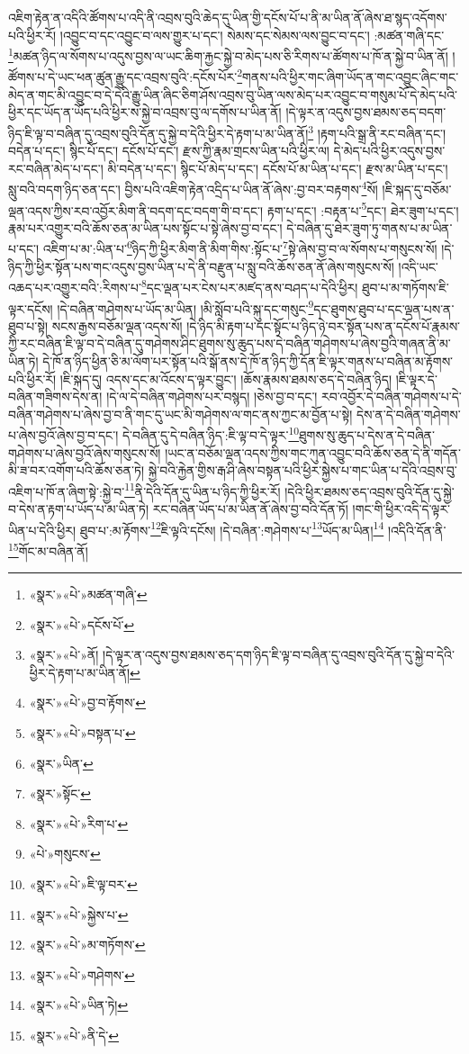 འཇིག་རྟེན་ན་འདིའི་ཚོགས་པ་འདི་ནི་འབྲས་བུའི་ཆེད་དུ་ཡིན་གྱི་དངོས་པོ་པ་ནི་མ་ཡིན་ནོ་ཞེས་ཐ་སྙད་འདོགས་པའི་ཕྱིར་རོ། །འབྱུང་བ་དང་འབྱུང་བ་ལས་གྱུར་པ་དང་། སེམས་དང་སེམས་ལས་བྱུང་བ་དང་། :མཚན་གཞི་དང་\footnote{«སྣར་»«པེ་»མཚན་གཞི་}མཚན་ཉིད་ལ་སོགས་པ་འདུས་བྱས་ལ་ཡང་ཆིག་རྐྱང་སྐྱེ་བ་མེད་པས་ཅི་རིགས་པ་ཚོགས་པ་ཁོ་ན་སྐྱེ་བ་ཡིན་ནོ། །ཚོགས་པ་དེ་ཡང་ཕན་ཚུན་རྒྱུ་དང་འབྲས་བུའི་:དངོས་པོར་\footnote{«སྣར་»«པེ་»དངོས་པོ་}གནས་པའི་ཕྱིར་གང་ཞིག་ཡོད་ན་གང་འབྱུང་ཞིང་གང་མེད་ན་གང་མི་འབྱུང་བ་དེ་དེའི་རྒྱུ་ཡིན་ཞིང་ཅིག་ཤོས་འབྲས་བུ་ཡིན་ལས་མེད་པར་འབྱུང་བ་གསུམ་པོ་དེ་མེད་པའི་ཕྱིར་དང་ཡོད་ན་ཡོད་པའི་ཕྱིར་ས་སྐྱེ་བ་འབྲས་བུ་ལ་དགོས་པ་ཡིན་ནོ། །དེ་ལྟར་ན་འདུས་བྱས་ཐམས་ཅད་བདག་ཉིད་ཇི་ལྟ་བ་བཞིན་དུ་འབྲས་བུའི་དོན་དུ་སྐྱེ་བ་དེའི་ཕྱིར་དེ་རྟག་པ་མ་ཡིན་ནོ།\footnote{«སྣར་»«པེ་»ནོ། །དེ་ལྟར་ན་འདུས་བྱས་ཐམས་ཅད་དག་ཉིད་ཇི་ལྟ་བ་བཞིན་དུ་འབྲས་བུའི་དོན་དུ་སྐྱེ་བ་དེའི་ཕྱིར་དེ་རྟག་པ་མ་ཡིན་ནོ།} །རྟག་པའི་སྒྲ་ནི་རང་བཞིན་དང་། བདེན་པ་དང་། སྙིང་པོ་དང་། དངོས་པོ་དང་། རྫས་ཀྱི་རྣམ་གྲངས་ཡིན་པའི་ཕྱིར་ལ། དེ་མེད་པའི་ཕྱིར་འདུས་བྱས་རང་བཞིན་མེད་པ་དང་། མི་བདེན་པ་དང་། སྙིང་པོ་མེད་པ་དང་། དངོས་པོ་མ་ཡིན་པ་དང་། རྫས་མ་ཡིན་པ་དང་། སླུ་བའི་བདག་ཉིད་ཅན་དང་། བྱིས་པའི་འཇིག་རྟེན་འདྲིད་པ་ཡིན་ནོ་ཞེས་:བྱ་བར་བརྟགས་\footnote{«སྣར་»«པེ་»བྱ་བ་རྟོགས་}སོ། །ཇི་སྐད་དུ་བཅོམ་ལྡན་འདས་ཀྱིས་རབ་འབྱོར་མིག་ནི་བདག་དང་བདག་གི་བ་དང་། རྟག་པ་དང་། :བརྟན་པ་\footnote{«སྣར་»«པེ་»བསྟན་པ་}དང་། ཐེར་ཟུག་པ་དང་། རྣམ་པར་འགྱུར་བའི་ཆོས་ཅན་མ་ཡིན་པས་སྟོང་པ་སྟེ་ཞེས་བྱ་བ་དང་། དེ་བཞིན་དུ་ཐེར་ཟུག་ཏུ་གནས་པ་མ་ཡིན་པ་དང་། འཇིག་པ་མ་:ཡིན་པ་\footnote{«སྣར་»ཡིན་}ཉིད་ཀྱི་ཕྱིར་མིག་ནི་མིག་གིས་:སྟོང་པ་\footnote{«སྣར་»སྟོང་}སྟེ་ཞེས་བྱ་བ་ལ་སོགས་པ་གསུངས་སོ། །དེ་ཉིད་ཀྱི་ཕྱིར་སྟོན་པས་གང་འདུས་བྱས་ཡིན་པ་དེ་ནི་བརྫུན་པ་སླུ་བའི་ཆོས་ཅན་ནོ་ཞེས་གསུངས་སོ། །འདི་ཡང་འཆད་པར་འགྱུར་བའི་:རིགས་པ་\footnote{«སྣར་»«པེ་»རིག་པ་}དང་ལྡན་པར་ངེས་པར་མཛད་ནས་བཤད་པ་དེའི་ཕྱིར། ཐུབ་པ་མ་གཏོགས་ཇི་ལྟར་དངོས། །དེ་བཞིན་གཤེགས་པ་ཡོད་མ་ཡིན། །མི་སློབ་པའི་སྐུ་དང་གསུང་\footnote{«པེ་»གསུངས་}དང་ཐུགས་ཐུབ་པ་དང་ལྡན་པས་ན་ཐུབ་པ་སྟེ། སངས་རྒྱས་བཅོམ་ལྡན་འདས་སོ། །དེ་ཉིད་མི་རྟག་པ་དང་སྟོང་པ་ཉིད་ཉེ་བར་སྟོན་པས་ན་དངོས་པོ་རྣམས་ཀྱི་རང་བཞིན་ཇི་ལྟ་བ་དེ་བཞིན་དུ་གཤེགས་ཤིང་ཐུགས་སུ་ཆུད་པས་དེ་བཞིན་གཤེགས་པ་ཞེས་བྱའི་གཞན་ནི་མ་ཡིན་ཏེ། དེ་ཁོ་ན་ཉིད་ཕྱིན་ཅི་མ་ལོག་པར་སྟོན་པའི་སྒོ་ནས་དེ་ཁོ་ན་ཉིད་ཀྱི་དོན་ཇི་ལྟར་གནས་པ་བཞིན་མ་རྟོགས་པའི་ཕྱིར་རོ། །ཇི་སྐད་དུ། འདས་དང་མ་འོངས་ད་ལྟར་བྱུང་། །ཆོས་རྣམས་ཐམས་ཅད་དེ་བཞིན་ཉིད། །ཇི་ལྟར་དེ་བཞིན་གཟིགས་དེས་ན། །དེ་ལ་དེ་བཞིན་གཤེགས་པར་བསྙད། །ཅེས་བྱ་བ་དང་། རབ་འབྱོར་དེ་བཞིན་གཤེགས་པ་དེ་བཞིན་གཤེགས་པ་ཞེས་བྱ་བ་ནི་གང་དུ་ཡང་མི་གཤེགས་ལ་གང་ནས་ཀྱང་མ་བྱོན་པ་སྟེ། དེས་ན་དེ་བཞིན་གཤེགས་པ་ཞེས་བྱའོ་ཞེས་བྱ་བ་དང་། དེ་བཞིན་དུ་དེ་བཞིན་ཉིད་:ཇི་ལྟ་བ་དེ་ལྟར་\footnote{«སྣར་»«པེ་»ཇི་ལྟ་བར་}ཐུགས་སུ་ཆུད་པ་དེས་ན་དེ་བཞིན་གཤེགས་པ་ཞེས་བྱའོ་ཞེས་གསུངས་སོ། །ཡང་ན་བཅོམ་ལྡན་འདས་ཀྱིས་གང་ཀུན་འབྱུང་བའི་ཆོས་ཅན་དེ་ནི་གདོན་མི་ཟ་བར་འགོག་པའི་ཆོས་ཅན་ཏེ། སྐྱེ་བའི་རྐྱེན་གྱིས་རྒ་ཤི་ཞེས་བསྟན་པའི་ཕྱིར་སྐྱེས་པ་གང་ཡིན་པ་དེའི་འབྲས་བུ་འཇིག་པ་ཁོ་ན་ཞིག་སྟེ་:སྐྱེ་བ་\footnote{«སྣར་»«པེ་»སྐྱེས་པ་}ནི་དེའི་དོན་དུ་ཡིན་པ་ཉིད་ཀྱི་ཕྱིར་རོ། །དེའི་ཕྱིར་ཐམས་ཅད་འབྲས་བུའི་དོན་དུ་སྐྱེ་བ་དེས་ན་རྟག་པ་ཡོད་པ་མ་ཡིན་ཏེ། རང་བཞིན་ཡོད་པ་མ་ཡིན་ནོ་ཞེས་བྱ་བའི་དོན་ཏོ། །གང་གི་ཕྱིར་འདི་དེ་ལྟར་ཡིན་པ་དེའི་ཕྱིར། ཐུབ་པ་:མ་རྟོགས་\footnote{«སྣར་»«པེ་»མ་གཏོགས་}ཇི་ལྟའི་དངོས། །དེ་བཞིན་:གཤེགས་པ་\footnote{«སྣར་»«པེ་»གཤེགས་}ཡོད་མ་ཡིན།\footnote{«སྣར་»«པེ་»ཡིན་ཏེ།} །འདིའི་དོན་ནི་\footnote{«སྣར་»«པེ་»ནི་དེ་}གོང་མ་བཞིན་ནོ། 